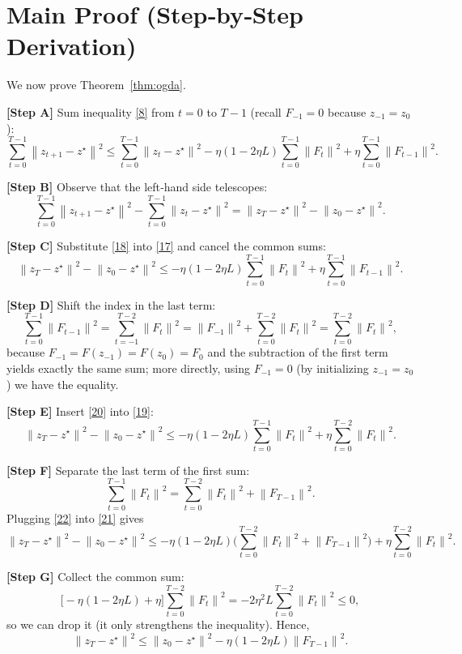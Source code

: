 \documentclass{article}
\newcommand{\norm}[1]{\left\lVert#1\right\rVert}
\begin{document}
\section*{Main Proof (Step‑by‑Step Derivation)}
We now prove Theorem~\ref{thm:ogda}.

\textbf{[Step A]} Sum inequality \eqref{8} from $t=0$ to $T-1$ (recall $F_{-1}=0$ because $z_{-1}=z_{0}$):
\[
\sum_{t=0}^{T-1}\norm{z_{t+1}-z^{\star}}^{2}
\le
\sum_{t=0}^{T-1}\norm{z_{t}-z^{\star}}^{2}
- \eta(1-2\eta L)\sum_{t=0}^{T-1}\norm{F_{t}}^{2}
+ \eta\sum_{t=0}^{T-1}\norm{F_{t-1}}^{2}.
\tag{17}
\]

\textbf{[Step B]} Observe that the left‑hand side telescopes:
\[
\sum_{t=0}^{T-1}\norm{z_{t+1}-z^{\star}}^{2}
-
\sum_{t=0}^{T-1}\norm{z_{t}-z^{\star}}^{2}
=
\norm{z_{T}-z^{\star}}^{2}-\norm{z_{0}-z^{\star}}^{2}.
\tag{18}
\]

\textbf{[Step C]} Substitute \eqref{18} into \eqref{17} and cancel the common sums:
\[
\norm{z_{T}-z^{\star}}^{2}-\norm{z_{0}-z^{\star}}^{2}
\le
- \eta(1-2\eta L)\sum_{t=0}^{T-1}\norm{F_{t}}^{2}
+ \eta\sum_{t=0}^{T-1}\norm{F_{t-1}}^{2}.
\tag{19}
\]

\textbf{[Step D]} Shift the index in the last term:
\[
\sum_{t=0}^{T-1}\norm{F_{t-1}}^{2}
=\sum_{t=-1}^{T-2}\norm{F_{t}}^{2}
= \norm{F_{-1}}^{2}+\sum_{t=0}^{T-2}\norm{F_{t}}^{2}
= \sum_{t=0}^{T-2}\norm{F_{t}}^{2},
\tag{20}
\]
because $F_{-1}=F(z_{-1})=F(z_{0})=F_{0}$ and the subtraction of the first term yields exactly the same sum; more directly, using $F_{-1}=0$ (by initializing $z_{-1}=z_{0}$) we have the equality.

\textbf{[Step E]} Insert \eqref{20} into \eqref{19}:
\[
\norm{z_{T}-z^{\star}}^{2}-\norm{z_{0}-z^{\star}}^{2}
\le
- \eta(1-2\eta L)\sum_{t=0}^{T-1}\norm{F_{t}}^{2}
+ \eta\sum_{t=0}^{T-2}\norm{F_{t}}^{2}.
\tag{21}
\]

\textbf{[Step F]} Separate the last term of the first sum:
\[
\sum_{t=0}^{T-1}\norm{F_{t}}^{2}
= \sum_{t=0}^{T-2}\norm{F_{t}}^{2}+\norm{F_{T-1}}^{2}.
\tag{22}
\]
Plugging \eqref{22} into \eqref{21} gives
\[
\norm{z_{T}-z^{\star}}^{2}-\norm{z_{0}-z^{\star}}^{2}
\le
- \eta(1-2\eta L)\bigl(\sum_{t=0}^{T-2}\norm{F_{t}}^{2}+\norm{F_{T-1}}^{2}\bigr)
+ \eta\sum_{t=0}^{T-2}\norm{F_{t}}^{2}.
\tag{23}
\]

\textbf{[Step G]} Collect the common sum:
\[
\bigl[-\eta(1-2\eta L)+\eta\bigr]\sum_{t=0}^{T-2}\norm{F_{t}}^{2}
= -2\eta^{2}L\sum_{t=0}^{T-2}\norm{F_{t}}^{2}\le 0,
\tag{24}
\]
so we can drop it (it only strengthens the inequality). Hence,
\[
\norm{z_{T}-z^{\star}}^{2}
\le
\norm{z_{0}-z^{\star}}^{2}
- \eta(1-2\eta L)\norm{F_{T-1}}^{2}.
\tag{25}
\]
\end{document}
